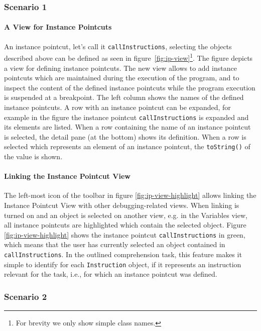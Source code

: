 \subsubsection{Scenario 1}
\label{sec:scenario-1}

\paragraph{A View for Instance Pointcuts}

An instance pointcut, let's call it \lstinline!callInstructions!, selecting the objects described above can be defined as seen in figure~\ref{fig:ip-view}\footnote{For brevity we only show simple class names.}.
The figure depicts a view for defining instance pointcuts.
The new view allows to add instance pointcuts which are maintained during the execution of the program, and to inspect the content of the defined instance pointcuts while the program execution is suspended at a breakpoint.
The left column shows the names of the defined instance pointcuts.
A row with an instance pointcut can be expanded, for example in the figure the instance pointcut \lstinline!callInstructions! is expanded and its elements are listed.
When a row containing the name of an instance pointcut is selected, the detail pane (at the bottom) shows its definition.
When a row is selected which represents an element of an instance pointcut, the \lstinline!toString()! of the value is shown.

\paragraph{Linking the Instance Pointcut View}

The left-most icon of the toolbar in figure \ref{fig:ip-view-highlight} allows linking the Instance Pointcut View with other debugging-related views.
When linking is turned on and an object is selected on another view, e.g. in the Variables view, all instance pointcuts are highlighted which contain the selected object.
Figure \ref{fig:ip-view-highlight} shows the instance pointcut \lstinline!callInstructions! in green, which means that the user has currently selected an object contained in \lstinline!callInstructions!.
In the outlined comprehension task, this feature makes it simple to identify for each \lstinline!Instruction! object, if it represents an instruction relevant for the task, i.e., for which an instance pointcut was defined.


\subsubsection{Scenario 2}

